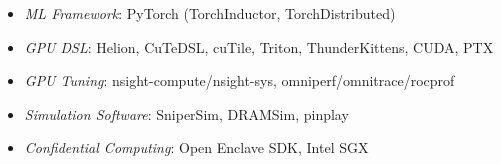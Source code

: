 \SubHeadingListStart
        \begin{itemize}
        \item[] \textit{ML Framework}: PyTorch (TorchInductor, TorchDistributed)
        \item[] \textit{GPU DSL}: Helion, CuTeDSL, cuTile, Triton, ThunderKittens, CUDA, PTX
        \item[] \textit{GPU Tuning}: nsight-compute/nsight-sys, omniperf/omnitrace/rocprof
        \item[] \textit{Simulation Software}: SniperSim, DRAMSim, pinplay
        \item[] \textit{Confidential Computing}: Open Enclave SDK, Intel SGX
        \end{itemize}

\SubHeadingListEnd